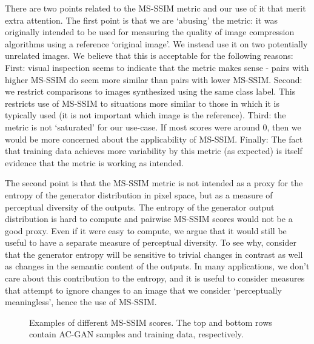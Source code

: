 \documentclass{article}
\begin{document}
There are two points related to the MS-SSIM metric and our use of it that
merit extra attention.
The first point is that we are `abusing' the metric: 
it was originally intended to be used for measuring the quality of image
compression algorithms using a reference `original image'.
We instead use it on two potentially unrelated images.
We believe that this is acceptable for the following reasons:
First: visual inspection seems to indicate that the metric makes sense - pairs with higher MS-SSIM
do seem more similar than pairs with lower MS-SSIM.
Second: we restrict comparisons to images synthesized using the same class label.
This restricts use of MS-SSIM to situations more similar to those in which it
is typically used (it is not important which image is the reference).
Third: the metric is not `saturated' for our use-case. If most scores were around 0,
then we would be more concerned about the applicability of MS-SSIM.
Finally: The fact that training data achieves more variability by this metric (as expected)
is itself evidence that the metric is working as intended.

The second point is that the MS-SSIM metric is not intended as a proxy
for the entropy of the generator distribution in pixel space,
but as a measure of perceptual diversity of the outputs.
The entropy of the generator output distribution is hard to compute
and pairwise MS-SSIM scores would not be a good proxy.
Even if it were easy to compute, we argue that it would still
be useful to have a separate measure of perceptual diversity.
To see why, consider that the generator entropy 
will be sensitive to trivial changes in contrast
as well as changes in the semantic content of the outputs.
In many applications, we don't care about this contribution to the entropy,
and it is useful to consider measures that attempt to ignore
changes to an image that we consider `perceptually meaningless',
hence the use of MS-SSIM.

\begin{figure}[t]
\captionsetup[subfigure]{labelformat=empty}
\setlength\tabcolsep{1.5pt}


\centering
\caption{Examples of different MS-SSIM scores.
The top and bottom rows contain AC-GAN samples and training data, respectively.
}
\label{fig:ssimexamples}
\end{figure}
\end{document}
